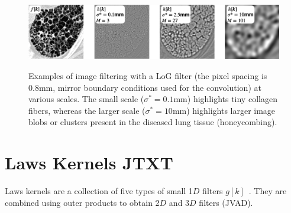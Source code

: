 \documentclass[fleqn,a4paper,oneside,openany]{book}
\newcommand\id[1]{{\hfill\normalsize{\idfont #1}}}
\newcommand\textid[1]{{\normalsize{\idfont #1}}}
\begin{document}
%
\begin{figure}
\centering
\includegraphics[trim = 0 0 0 0, clip, width=\linewidth]{LoG_examples.png}\\
\caption{Examples of image filtering with a LoG filter (the pixel spacing is 0.8mm, mirror boundary conditions used for the convolution) at various scales.
The small scale ($\sigma^*=0.1$mm) highlights tiny collagen fibers, whereas the larger scale ($\sigma^*=10$mm) highlights larger image blobs or clusters present in the diseased lung tissue (honeycombing).}
  \label{fig:LoG_examples}
\end{figure}
%
%
\section[Laws Kernels]{Laws Kernels \id{JTXT}}
%
Laws kernels are a collection of five types of small 1$D$ filters $g[k]$~\cite{Law1980}.
They are combined using outer products to obtain 2$D$ and 3$D$ filters (\textid{JVAD}).
\end{document}
